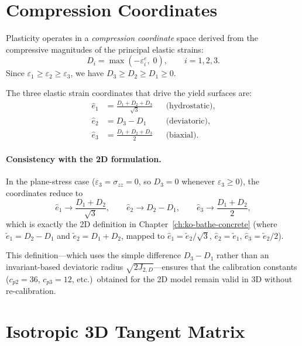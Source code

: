 \section{Compression Coordinates}
\label{sec:kb3d-compression}

Plasticity operates in a \emph{compression coordinate} space derived from the
compressive magnitudes of the principal elastic strains:
\begin{equation}
  D_i = \max(-\varepsilon_i^e, \; 0), \qquad i = 1, 2, 3.
  \label{eq:Di}
\end{equation}
Since $\varepsilon_1 \ge \varepsilon_2 \ge \varepsilon_3$, we have
$D_3 \ge D_2 \ge D_1 \ge 0$.

The three elastic strain coordinates that drive the yield surfaces are:
\begin{align}
  \hat{e}_1 &= \frac{D_1 + D_2 + D_3}{\sqrt{3}}
             && \text{(hydrostatic)}, \label{eq:ee1-3d} \\
  \hat{e}_2 &= D_3 - D_1
             && \text{(deviatoric)}, \label{eq:ee2-3d} \\
  \hat{e}_3 &= \frac{D_1 + D_2 + D_3}{2}
             && \text{(biaxial)}. \label{eq:ee3-3d}
\end{align}

\paragraph{Consistency with the 2D formulation.}
In the plane-stress case ($\varepsilon_3 = \sigma_{zz} = 0$, so
$D_3 = 0$ whenever $\varepsilon_3 \ge 0$), the coordinates reduce to
\[
  \hat{e}_1 \to \frac{D_1 + D_2}{\sqrt{3}}, \qquad
  \hat{e}_2 \to D_2 - D_1, \qquad
  \hat{e}_3 \to \frac{D_1 + D_2}{2},
\]
which is exactly the 2D definition in Chapter~\ref{ch:ko-bathe-concrete}
(where $\tilde{e}_1 = D_2 - D_1$ and $\tilde{e}_2 = D_1 + D_2$, mapped to
$\hat{e}_1 = \tilde{e}_2/\sqrt{3}$, $\hat{e}_2 = \tilde{e}_1$,
$\hat{e}_3 = \tilde{e}_2/2$).

This definition—which uses the simple difference $D_3 - D_1$ rather than an
invariant-based deviatoric radius $\sqrt{2J_{2,D}}$---ensures that the
calibration constants ($c_{p2} = 36$, $c_{p3} = 12$, etc.)\ obtained for
the 2D model remain valid in 3D without re-calibration.


\section{Isotropic 3D Tangent Matrix}
\label{sec:kb3d-tangent}

